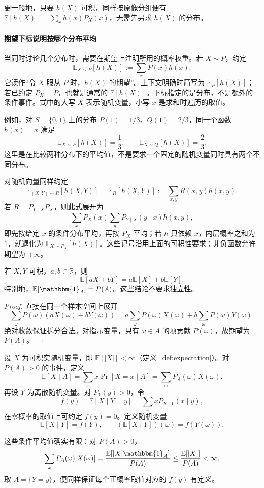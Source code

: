 \documentclass[lang=cn,a4paper,fontset=none,zihao=false,10pt,openany,twoside]{beautybook}
\numberwithin{algorithm}{chapter}
\newcommand{\R}{\mathbb R}
\begin{document}
更一般地，只要 $h(X)$ 可积，同样按原像分组便有 $\mathbb E[h(X)]=\sum_xh(x)P_X(x)$，无需先另求 $h(X)$ 的分布。

\paragraph{期望下标说明按哪个分布平均}
当同时讨论几个分布时，需要在期望上注明所用的概率权重。若 $X\sim P$，约定
\[
 \mathbb E_{X\sim P}[h(X)]:=\sum_xP(x)h(x).
\]
它读作“令 $X$ 服从 $P$ 时，$h(X)$ 的期望”。上下文明确时简写为 $\mathbb E_P[h(X)]$；若已约定 $P_X=P$，也就是通常的 $\mathbb E[h(X)]$。下标指定的是分布，不是额外的条件事件。式中的大写 $X$ 表示随机变量，小写 $x$ 是求和时遍历的取值。

例如，对 $S=\{0,1\}$ 上的分布 $P(1)=1/3$、$Q(1)=2/3$，同一个函数 $h(x)=x$ 满足
\[
 \mathbb E_{X\sim P}[h(X)]=\frac13,
 \qquad \mathbb E_{X\sim Q}[h(X)]=\frac23.
\]
这里是在比较两种分布下的平均值，不是要求一个固定的随机变量同时具有两个不同分布。

对随机向量同样约定
\[
 \mathbb E_{(X,Y)\sim R}[h(X,Y)]
 =\mathbb E_R[h(X,Y)]
 :=\sum_{x,y}R(x,y)h(x,y).
\]
若 $R=P_{Y\mid X}P_X$，则此式展开为
\[
 \sum_xP_X(x)\sum_yP_{Y\mid X}(y\mid x)h(x,y),
\]
即先按给定 $x$ 的条件分布平均，再按 $P_X$ 平均；若 $h$ 只依赖 $x$，内层概率之和为 $1$，就退化为 $\mathbb E_{X\sim P_X}[h(X)]$。这些记号沿用上面的可积性要求；非负函数允许期望为 $+\infty$。

\begin{proposition}[期望的线性性]\label{prop:expectation-linearity}
若 $X,Y$ 可积，$a,b\in\R$，则
\[
 \mathbb E[aX+bY]=a\mathbb E[X]+b\mathbb E[Y].
\]
特别地，$\mathbb E[\mathbbm{1}_A]=P(A)$。这些结论不要求独立性。
\end{proposition}
\begin{proof}
直接在同一个样本空间上展开
\[
 \sum_\omega P(\omega)(aX(\omega)+bY(\omega))
 =a\sum_\omega P(\omega)X(\omega)+b\sum_\omega P(\omega)Y(\omega).
\]
绝对收敛保证拆分合法。对指示变量，只有 $\omega\in A$ 的项贡献 $P(\omega)$，故期望为 $P(A)$。
\end{proof}

\begin{definition}[条件期望]\label{def:conditional-expectation}
设 $X$ 为可积实随机变量，即 $\mathbb E[|X|]<\infty$（定义~\ref{def:expectation}）。对 $P(A)>0$ 的事件，定义
\[
 \mathbb E[X\mid A]=\sum_xx\Pr[X=x\mid A]
 =\sum_\omega P_A(\omega)X(\omega).
\]
再设 $Y$ 为离散随机变量。对 $P_Y(y)>0$，令
\[
 f(y)=\mathbb E[X\mid Y=y]=\sum_xxP_{X\mid Y}(x\mid y),
\]
在零概率的取值上可约定 $f(y)=0$。定义随机变量
\[
 \mathbb E[X\mid Y]=f(Y),\qquad
 (\mathbb E[X\mid Y])(\omega)=f(Y(\omega)).
\]
\end{definition}
这些条件平均值确实有限：对 $P(A)>0$，
\[
 \sum_\omega P_A(\omega)|X(\omega)|
 =\frac{\mathbb E[|X|\mathbbm{1}_A]}{P(A)}
 \le\frac{\mathbb E[|X|]}{P(A)}<\infty.
\]
取 $A=\{Y=y\}$，便同样保证每个正概率取值对应的 $f(y)$ 有定义。
\end{document}
